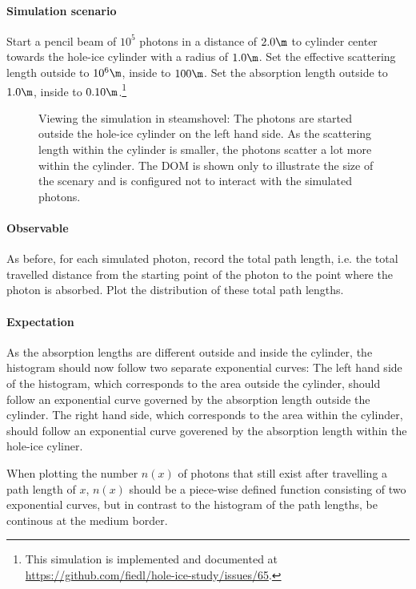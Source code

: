 \paragraph{Simulation scenario} Start a pencil beam of $10^5$ photons in a distance of $2.0\m$ to cylinder center towards the hole-ice cylinder with a radius of $1.0\m$. Set the effective scattering length outside to $10^6\m$, inside to $100\m$. Set the absorption length outside to $1.0\m$, inside to $0.10\m$.\footnote{This simulation is implemented and documented at \url{https://github.com/fiedl/hole-ice-study/issues/65}.}

\begin{figure}
  \caption{Viewing the simulation in steamshovel: The photons are started outside the hole-ice cylinder on the left hand side. As the scattering length within the cylinder is smaller, the photons scatter a lot more within the cylinder. The DOM is shown only to illustrate the size of the scenary and is configured not to interact with the simulated photons.}
\end{figure}

\paragraph{Observable} As before, for each simulated photon, record the total path length, i.e. the total travelled distance from the starting point of the photon to the point where the photon is absorbed. Plot the distribution of these total path lengths.

\paragraph{Expectation} As the absorption lengths are different outside and inside the cylinder, the histogram should now follow two separate exponential curves: The left hand side of the histogram, which corresponds to the area outside the cylinder, should follow an exponential curve governed by the absorption length outside the cylinder. The right hand side, which corresponds to the area within the cylinder, should follow an exponential curve goverened by the absorption length within the hole-ice cyliner.

When plotting the number $n(x)$ of photons that still exist after travelling a path length of $x$, $n(x)$ should be a piece-wise defined function consisting of two exponential curves, but in contrast to the histogram of the path lengths, be continous at the medium border.

